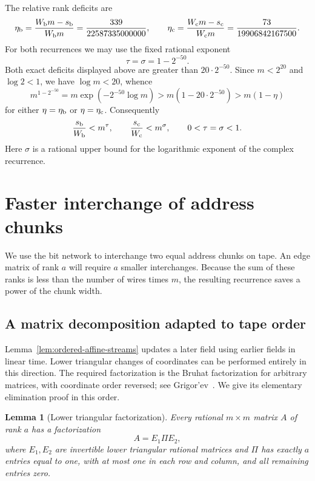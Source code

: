 \documentclass[11pt]{article}
\newtheorem{lemma}[theorem]{Lemma}
\theoremstyle{definition}
\begin{document}
The relative rank deficits are
\[
 \eta_{\rm b}=\frac{W_{\rm b}m-s_{\rm b}}{W_{\rm b}m}
       =\frac{339}{22587335000000},\qquad
 \eta_{\rm c}=\frac{W_{\rm c}m-s_{\rm c}}{W_{\rm c}m}
       =\frac{73}{19906842167500}.
\]
For both recurrences we may use the fixed rational exponent
\begin{equation}
 \tau=\sigma=1-2^{-50}.
 \label{eq:explicit-motif-exponents}
\end{equation}
Both exact deficits displayed above are greater than $20\cdot2^{-50}$.
Since $m<2^{20}$ and $\log 2<1$, we have $\log m<20$, whence
\[
 m^{1-2^{-50}}
 =m\exp(-2^{-50}\log m)
 >m(1-20\cdot2^{-50})>m(1-\eta)
\]
for either $\eta=\eta_{\rm b}$ or $\eta=\eta_{\rm c}$.
Consequently
\[
 \frac{s_{\rm b}}{W_{\rm b}}<m^\tau,
 \qquad \frac{s_{\rm c}}{W_{\rm c}}<m^\sigma,
 \qquad 0<\tau=\sigma<1.
\]
Here $\sigma$ is a rational upper bound for the logarithmic exponent
of the complex recurrence.
 \section{Faster interchange of address chunks}
\label{sec:tape-interchange}

We use the bit network to interchange two equal address chunks on tape.
An edge matrix of rank $a$ will require $a$ smaller interchanges.
Because the sum of these ranks is less than the number of wires times
$m$, the resulting recurrence saves a power of the chunk width.

\subsection{A matrix decomposition adapted to tape order}

Lemma~\ref{lem:ordered-affine-streams} updates a later field using
earlier fields in linear time.  Lower triangular changes of coordinates
can be performed entirely in this direction. The required factorization
is the Bruhat factorization for arbitrary matrices, with coordinate order
reversed; see Grigor'ev~\cite[Appendix~A.2, Proposition~14(c)]{Grigoriev1982}.
We give its elementary elimination proof in this order.

\begin{lemma}[Lower triangular factorization]
\label{lem:lower-lower}
Every rational $m\times m$ matrix $A$ of rank $a$ has a factorization
\[
 A=E_1\Pi E_2,
\]
where $E_1,E_2$ are invertible lower triangular rational matrices and
$\Pi$ has exactly $a$ entries equal to one, with at most one in each row
and column, and all remaining entries zero.
\end{lemma}
\end{document}
